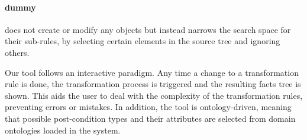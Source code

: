 
\paragraph{dummy} %
\label{par:dummy}

does not create or modify any objects but instead narrows the search space for their sub-rules, by selecting certain elements in the source tree and ignoring others.




Our tool follows an interactive paradigm. Any time a change to a transformation rule is done, the transformation process is triggered and the resulting facts tree is shown. This aids the user to deal with the complexity of the transformation rules, preventing errors or mistakes. In addition, the tool is ontology-driven, meaning that possible post-condition types and their attributes are selected from domain ontologies loaded in the system.

